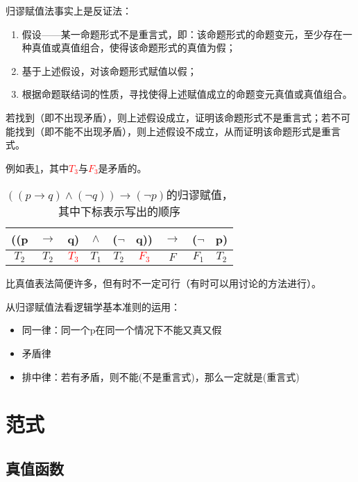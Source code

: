 \documentclass[12pt,onecolumn,a4paper]{book}
\numberwithin{table}{subsection}
\numberwithin{equation}{subsection}
\begin{document}
归谬赋值法事实上是反证法：

\begin{enumerate}[itemsep=0pt,parsep=0pt]
    \item 假设——某一命题形式不是重言式，即：该命题形式的命题变元，至少存在一种真值或真值组合，使得该命题形式的真值为假；
    \item 基于上述假设，对该命题形式赋值以假；
    \item 根据命题联结词的性质，寻找使得上述赋值成立的命题变元真值或真值组合。
\end{enumerate}

若找到（即不出现矛盾），则上述假设成立，证明该命题形式不是重言式；若不可能找到（即不能不出现矛盾），则上述假设不成立，从而证明该命题形式是重言式。

例如表\ref{guimiu}，其中\textcolor{red}{$T_3$}与\textcolor{red}{$F_3$}是矛盾的。

\begin{table}[h]
    \centering
    \begin{tabular}{ccccccccc}
    ((p  & $\rightarrow$ & q)   & $\land$ & ($\lnot$ & q))                       & $\rightarrow$          & ($\lnot$ & p)   \\ \hline
    $T_2$ & $T_2$          & \textcolor{red}{$T_3$} & $T_1$    & $T_2$     & \multicolumn{1}{c|}{\textcolor{red}{$F_3$}} & \multicolumn{1}{c|}{$F$} & $F_1$     & $T_2$
    \end{tabular}
    \caption{$((p\rightarrow q)\land(\lnot q))\rightarrow(\lnot p)$的归谬赋值，其中下标表示写出的顺序}
    \label{guimiu}
\end{table}

比真值表法简便许多，但有时不一定可行（有时可以用讨论的方法进行）。


从归谬赋值法看逻辑学基本准则的运用：

\begin{itemize}[itemsep=0pt,parsep=0pt]
    \item 同一律：同一个p在同一个情况下不能又真又假
    \item 矛盾律
    \item 排中律：若有矛盾，则不能(不是重言式)，那么一定就是(重言式)
\end{itemize}

\chapter{范式}\label{chap3}

\section{真值函数}
\end{document}
